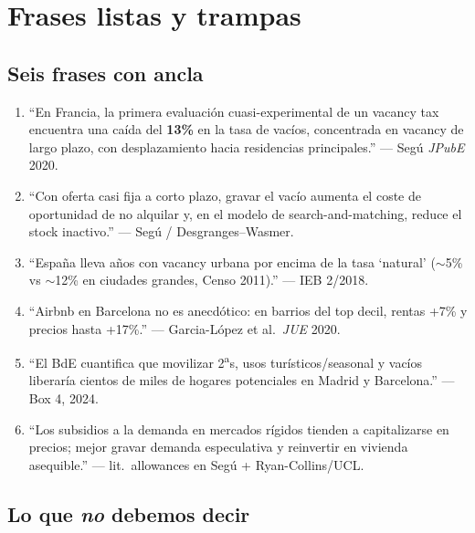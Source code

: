 \documentclass[11pt,a4paper]{report}
\begin{document}
\chapter{Frases listas y trampas}
\label{ch:frases}

\section{Seis frases con ancla}

\begin{enumerate}[leftmargin=1.6em, itemsep=0.6em]
  \item ``En Francia, la primera evaluaci\'on cuasi-experimental de un vacancy tax
        encuentra una ca\'ida del \textbf{13\%} en la tasa de vac\'ios, concentrada en
        vacancy de largo plazo, con desplazamiento hacia residencias principales.''
        --- Seg\'u \emph{JPubE} 2020.
  \item ``Con oferta casi fija a corto plazo, gravar el vac\'io aumenta el coste de
        oportunidad de no alquilar y, en el modelo de search-and-matching, reduce
        el stock inactivo.'' --- Seg\'u / Desgranges--Wasmer.
  \item ``España lleva a\~nos con vacancy urbana por encima de la tasa `natural'
        ($\sim$5\% vs $\sim$12\% en ciudades grandes, Censo 2011).'' --- IEB 2/2018.
  \item ``Airbnb en Barcelona no es anecd\'otico: en barrios del top decil, rentas +7\%
        y precios hasta +17\%.'' --- Garcia-L\'opez et al.\ \emph{JUE} 2020.
  \item ``El BdE cuantifica que movilizar 2\textsuperscript{a}s, usos tur\'isticos/seasonal
        y vac\'ios liberar\'ia cientos de miles de hogares potenciales en Madrid y Barcelona.''
        --- Box 4, 2024.
  \item ``Los subsidios a la demanda en mercados r\'igidos tienden a capitalizarse en precios;
        mejor gravar demanda especulativa y reinvertir en vivienda asequible.''
        --- lit.\ allowances en Seg\'u + Ryan-Collins/UCL.
\end{enumerate}

\section{Lo que \emph{no} debemos decir}
\end{document}
